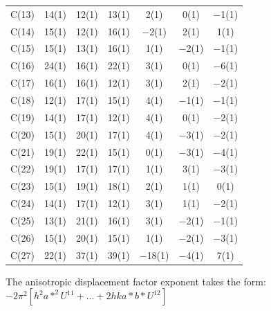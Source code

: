 \begin{table}[h]
\begin{tabular}{p{1in}cccccc}
C(13)&14(1) &12(1)&13(1) &2(1)&0(1) &$-$1(1)\\
C(14)&15(1) &12(1)&16(1) &$-$2(1)&2(1) &1(1)\\
C(15)&15(1) &13(1)&16(1) &1(1)&$-$2(1) &$-$1(1)\\
C(16)&24(1) &16(1)&22(1) &3(1)&0(1) &$-$6(1)\\
C(17)&16(1) &16(1)&12(1) &3(1)&2(1) &$-$2(1)\\
C(18)&12(1) &17(1)&15(1) &4(1)&$-$1(1) &$-$1(1)\\
C(19)&14(1) &17(1)&12(1) &4(1)&0(1) &$-$2(1)\\
C(20)&15(1) &20(1)&17(1) &4(1)&$-$3(1) &$-$2(1)\\
C(21)&19(1) &22(1)&15(1) &0(1)&$-$3(1) &$-$4(1)\\
C(22)&19(1) &17(1)&17(1) &1(1)&3(1) &$-$3(1)\\
C(23)&15(1) &19(1)&18(1) &2(1)&1(1) &0(1)\\
C(24)&14(1) &17(1)&12(1) &3(1)&1(1) &$-$2(1)\\
C(25)&13(1) &21(1)&16(1) &3(1)&$-$2(1) &$-$1(1)\\
C(26)&15(1) &20(1)&15(1) &1(1)&$-$2(1) &$-$3(1)\\
C(27)&22(1) &37(1)&39(1) &$-$18(1)&$-$4(1) &7(1)\\
\bottomrule
\end{tabular}
\end{table}
{ \footnotesize
The anisotropic displacement factor exponent takes the form: 
$-2\pi^2\left[ h^2a*^2U^{11} + ... + 2 h k a* b* U^{12} \right]$ }

\pagebreak


